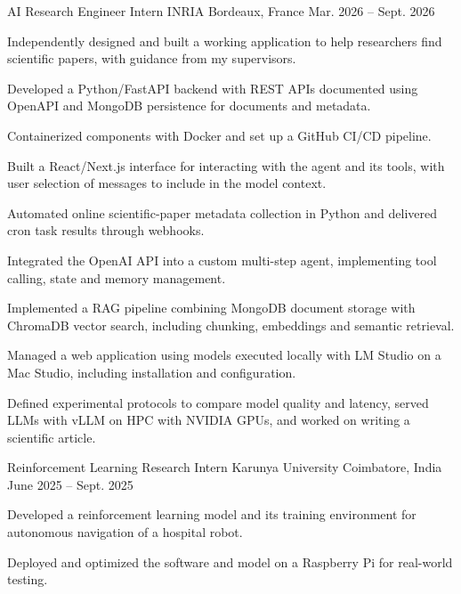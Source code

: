 
\begin{cventries}
  \cventry
    {AI Research Engineer Intern}
    {INRIA}
    {Bordeaux, France}
    {Mar. 2026 -- Sept. 2026}
    {
      \begin{cvitems}
        \item {Independently designed and built a working application to help researchers find scientific papers, with guidance from my supervisors.}
        \item {Developed a Python/FastAPI backend with REST APIs documented using OpenAPI and MongoDB persistence for documents and metadata.}
        \item {Containerized components with Docker and set up a GitHub CI/CD pipeline.}
        \item {Built a React/Next.js interface for interacting with the agent and its tools, with user selection of messages to include in the model context.}
        \item {Automated online scientific-paper metadata collection in Python and delivered cron task results through webhooks.}
        \item {Integrated the OpenAI API into a custom multi-step agent, implementing tool calling, state and memory management.}
        \item {Implemented a RAG pipeline combining MongoDB document storage with ChromaDB vector search, including chunking, embeddings and semantic retrieval.}
        \item {Managed a web application using models executed locally with LM Studio on a Mac Studio, including installation and configuration.}
        \item {Defined experimental protocols to compare model quality and latency, served LLMs with vLLM on HPC with NVIDIA GPUs, and worked on writing a scientific article.}
      \end{cvitems}
    }

  \cventry
    {Reinforcement Learning Research Intern}
    {Karunya University}
    {Coimbatore, India}
    {June 2025 -- Sept. 2025}
    {
      \begin{cvitems}
        \item {Developed a reinforcement learning model and its training environment for autonomous navigation of a hospital robot.}
        \item {Deployed and optimized the software and model on a Raspberry Pi for real-world testing.}
      \end{cvitems}
    }
\end{cventries}
